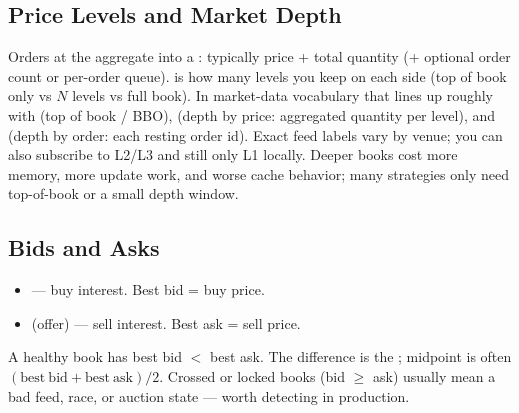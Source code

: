\subsection{Price Levels and Market Depth}
\label{subsec:order-book-price-levels}
Orders at the  aggregate into a : typically 
price + total quantity (+ optional order count or per-order queue).
\newline
{} is how many levels you keep on each side (top of book only vs 
$N$ levels vs full book). In market-data vocabulary that lines up roughly with 
 (top of book / BBO),  (depth by price: aggregated quantity 
per level), and  (depth by order: each resting order id). Exact feed labels 
vary by venue; you can also subscribe to L2/L3 and still  only L1 locally. 
Deeper books cost more memory, more update work, and worse cache behavior; many strategies 
only need top-of-book or a small depth window.

\subsection{Bids and Asks}
\label{subsec:order-book-bids-asks}
\begin{itemize}
    \item {} --- buy interest. Best bid =  buy price.
    \item {} (offer) --- sell interest. Best ask =  sell price.
\end{itemize}
A healthy book has best bid $<$ best ask. The difference is the ; 
midpoint is often $(\mathrm{best\ bid} + \mathrm{best\ ask})/2$. 
Crossed or locked books (bid $\ge$ ask) usually mean a bad feed, race, or auction state --- 
worth detecting in production.

